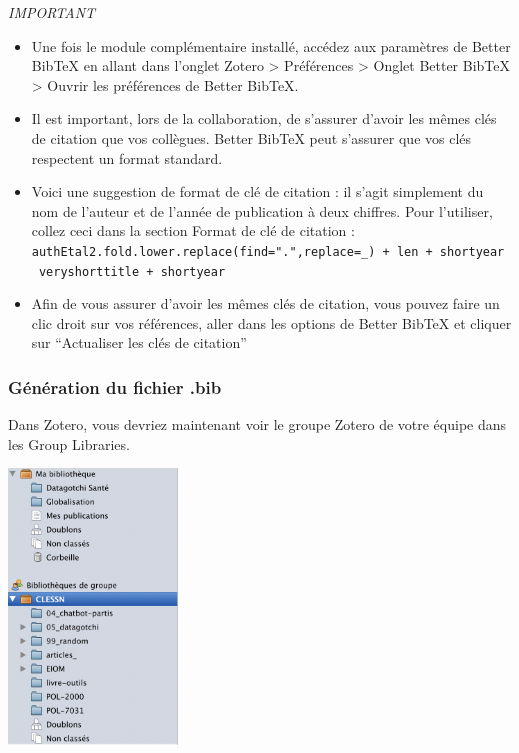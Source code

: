 \documentclass[
  letterpaper,
]{scrbook}
\begin{document}
\emph{IMPORTANT}

\begin{itemize}
\item
  Une fois le module complémentaire installé, accédez aux paramètres de
  Better BibTeX en allant dans l'onglet Zotero \textgreater{}
  Préférences \textgreater{} Onglet Better BibTeX \textgreater{} Ouvrir
  les préférences de Better BibTeX.
\item
  Il est important, lors de la collaboration, de s'assurer d'avoir les
  mêmes clés de citation que vos collègues. Better BibTeX peut s'assurer
  que vos clés respectent un format standard.
\item
  Voici une suggestion de format de clé de citation : il s'agit
  simplement du nom de l'auteur et de l'année de publication à deux
  chiffres. Pour l'utiliser, collez ceci dans la section Format de clé
  de citation :
  \texttt{authEtal2.fold.lower.replace(find=".",replace=\_)\ +\ len\ +\ shortyear\ \textbar{}\ veryshorttitle\ +\ shortyear}
\item
  Afin de vous assurer d'avoir les mêmes clés de citation, vous pouvez
  faire un clic droit sur vos références, aller dans les options de
  Better BibTeX et cliquer sur ``Actualiser les clés de citation''
\end{itemize}

\hypertarget{guxe9nuxe9ration-du-fichier-.bib}{%
\subsubsection{Génération du fichier
.bib}\label{guxe9nuxe9ration-du-fichier-.bib}}

Dans Zotero, vous devriez maintenant voir le groupe Zotero de votre
équipe dans les Group Libraries.

\includegraphics[width=1.77083in,height=\textheight]{images/chapitre6_zotero.png}
\end{document}
